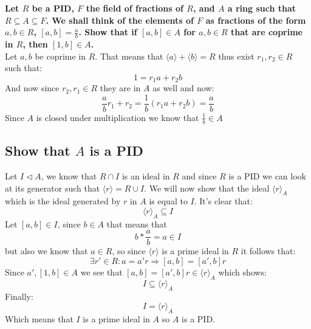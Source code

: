 \documentclass{article}
\theoremstyle{plain}
\DeclareMathOperator{\idealin}{\triangleleft}
\begin{document}
	\newpage
	
	\textbf{
	Let $R$ be a PID, $F$ the field of fractions of $R$, and $A$ a ring such 
	that $R\subseteq A \subseteq F$. We shall think of the elements of $F$ as 
	fractions of the form $a,b\in R$, $[a,b]=\frac{a}{b}$. Show that if $[a,b]
	\in A$ for $a,b\in R$ that are coprime in $R$, then $[1,b]\in A$.} \\
	Let $a,b$ be coprime in $R$. That means that 
	$\langle a\rangle + \langle b\rangle = R$ thus exist $r_1,r_2\in R$ such 
	that:
	\[
		1 = r_1a + r_2b
	\]
	And now since $r_2,r_1\in R$ they are in $A$ as well and now:
	\[
		\frac{a}{b}r_1 + r_2 = \frac{1}{b}(r_1a + r_2b) = \frac{a}{b}
	\]
	Since $A$ is closed under multiplication we know that $\frac{1}{b}\in A$
	
	\newpage
	
	\subsection{Show that $A$ is a PID}
	Let $I \idealin A$, we know that $R \cap I$ is an ideal in $R$ and
	since $R$ is a PID we can look at its generator such that 
	$\langle r \rangle = R\cup I$. We will now show that the ideal 
	$\langle r \rangle_A$ which is the ideal generated by $r$ in $A$ is
	equal to $I$. It's clear that:
	\[
		\langle r \rangle_A \subseteq I
	\]
	Let $[a,b]\in I$, since $b\in A$ that means that 
	\[
		b * \frac{a}{b} = a \in I
	\] 
	but also we know that $a\in R$, so since $\langle r \rangle$ is a prime 
	ideal in $R$ it follows that:
	\[
		\exists r'\in R \colon a = a'r \Rightarrow [a,b] = [a',b]r
	\]
	Since $a',[1,b]\in A$ we see that $[a,b] = [a',b]r \in \langle r 
	\rangle_A$ which shows:
	\[
		I \subseteq \langle r \rangle_A
	\]
	Finally:
	\[
		I = \langle r \rangle_A
	\]
	Which means that $I$ is a prime ideal in $A$ so $A$ is a PID.
	
	\newpage
	
\end{document}
